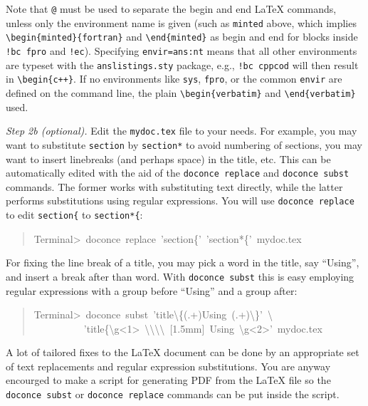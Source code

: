 \documentclass[a4paper]{article}
\begin{document}
Note that \texttt{@} must be used to separate the begin and end LaTeX
commands, unless only the environment name is given (such as \texttt{minted}
above, which implies \texttt{\textbackslash{}begin\{minted\}\{fortran\}} and \texttt{\textbackslash{}end\{minted\}} as
begin and end for blocks inside \texttt{!bc fpro} and \texttt{!ec}).  Specifying
\texttt{envir=ans:nt} means that all other environments are typeset with the
\texttt{anslistings.sty} package, e.g., \texttt{!bc cppcod} will then result in
\texttt{\textbackslash{}begin\{c++\}}. If no environments like \texttt{sys}, \texttt{fpro}, or the common
\texttt{envir} are defined on the command line, the plain \texttt{\textbackslash{}begin\{verbatim\}}
and \texttt{\textbackslash{}end\{verbatim\}} used.

\emph{Step 2b (optional).} Edit the \texttt{mydoc.tex} file to your needs.
For example, you may want to substitute \texttt{section} by \texttt{section*} to
avoid numbering of sections, you may want to insert linebreaks
(and perhaps space) in the title, etc. This can be automatically
edited with the aid of the \texttt{doconce replace} and \texttt{doconce subst}
commands. The former works with substituting text directly, while the
latter performs substitutions using regular expressions.
You will use \texttt{doconce replace} to edit \texttt{section\{} to \texttt{section*\{}:
%
\begin{quote}{\ttfamily \raggedright \noindent
Terminal>~doconce~replace~'section\{'~'section*\{'~mydoc.tex
}
\end{quote}

For fixing the line break of a title, you may pick a word in the
title, say ``Using'', and insert a break after than word. With
\texttt{doconce subst} this is easy employing regular expressions with
a group before ``Using'' and a group after:
%
\begin{quote}{\ttfamily \raggedright \noindent
Terminal>~doconce~subst~'title\textbackslash{}\{(.+)Using~(.+)\textbackslash{}\}'~\textbackslash{}\\
~~~~~~~~~~'title\{\textbackslash{}g<1>~\textbackslash{}\textbackslash{}\textbackslash{}\textbackslash{}~{[}1.5mm{]}~Using~\textbackslash{}g<2>'~mydoc.tex
}
\end{quote}

A lot of tailored fixes to the LaTeX document can be done by
an appropriate set of text replacements and regular expression
substitutions. You are anyway encourged to make a script for
generating PDF from the LaTeX file so the \texttt{doconce subst} or
\texttt{doconce replace} commands can be put inside the script.
\end{document}
